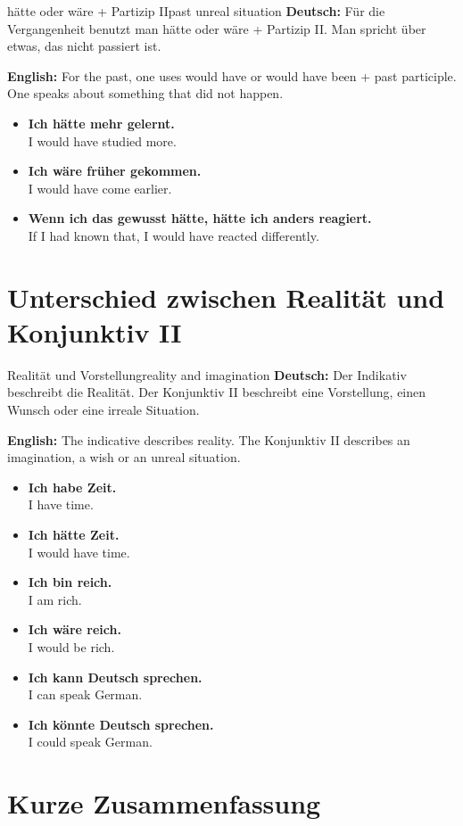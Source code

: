 \documentclass[a4paper,11pt]{article}
\newcommand{\GermanText}[1]{\textbf{Deutsch: }#1\par}
\newcommand{\EnglishText}[1]{{\small\color{SoftGray}\textbf{English: }#1\par}}
\newcommand{\ExampleItem}[2]{\item \textbf{#1}\\{\small\color{SoftGray}#2}}
\begin{document}
    \begin{grammarentry}{hätte oder wäre + Partizip II}{past unreal situation}
        \GermanText{Für die Vergangenheit benutzt man hätte oder wäre + Partizip II. Man spricht über etwas, das nicht passiert ist.}
        \EnglishText{For the past, one uses would have or would have been + past participle. One speaks about something that did not happen.}
        
        \begin{exbox}
            \begin{itemize}
                \ExampleItem{Ich hätte mehr gelernt.}{I would have studied more.}
                \ExampleItem{Ich wäre früher gekommen.}{I would have come earlier.}
                \ExampleItem{Wenn ich das gewusst hätte, hätte ich anders reagiert.}{If I had known that, I would have reacted differently.}
            \end{itemize}
        \end{exbox}
    \end{grammarentry}
    
    \section{Unterschied zwischen Realität und Konjunktiv II}
    
    \begin{grammarentry}{Realität und Vorstellung}{reality and imagination}
        \GermanText{Der Indikativ beschreibt die Realität. Der Konjunktiv II beschreibt eine Vorstellung, einen Wunsch oder eine irreale Situation.}
        \EnglishText{The indicative describes reality. The Konjunktiv II describes an imagination, a wish or an unreal situation.}
        
        \begin{exbox}
            \begin{itemize}
                \ExampleItem{Ich habe Zeit.}{I have time.}
                \ExampleItem{Ich hätte Zeit.}{I would have time.}
                \ExampleItem{Ich bin reich.}{I am rich.}
                \ExampleItem{Ich wäre reich.}{I would be rich.}
                \ExampleItem{Ich kann Deutsch sprechen.}{I can speak German.}
                \ExampleItem{Ich könnte Deutsch sprechen.}{I could speak German.}
            \end{itemize}
        \end{exbox}
    \end{grammarentry}
    
    \section{Kurze Zusammenfassung}
    
\end{document}
